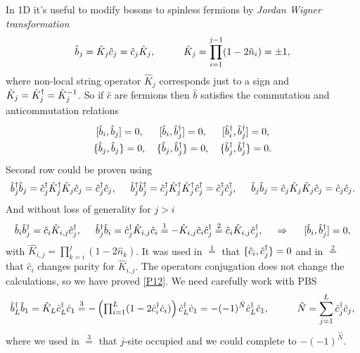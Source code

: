 In 1D it's useful to modify bosons to spinless fermions by \textit{Jordan Wigner transformation}
\begin{equation*}
	\hat{b}_j = \hat{K}_j \hat{c}_j = \hat{c}_j \hat{K}_j,
	\hspace{10 mm} 
	\hat{K}_j = \prod_{i=1}^{j-1} (1-2 \hat{n}_i) = \pm 1, 
\end{equation*}
where non-local string operator $\hat{K}_j$ corresponds just to a sign and $\hat{K}_j = \hat{K}_j^{\dag} = \hat{K}_j^{-1}$. So if $\hat{c}$ are fermions then $\hat{b}$ satisfies the commutation and anticommutation relations 
\begin{equation}
\renewcommand{\arraystretch}{1.4}
	\begin{tabular}{ccc}
	$[\hat{b}_i, \hat{b}_j] = 0,$ & $[\hat{b}_i, \hat{b}_j\D] = 0,$ & $[\hat{b}_i\D, \hat{b}_j\D] = 0,$ \\
	$\{\hat{b}_j, \hat{b}_j\} = 0,$ & $\{\hat{b}_j, \hat{b}_j\D\} = 0,$ & $\{\hat{b}_j\D, \hat{b}_j\D\} = 0.$
	\end{tabular}
	\label{P12}
\end{equation}
Second row could be proven using
\begin{equation*}
	\hat{b}^{\dag}_j \hat{b}_j = \hat{c}_j^{\dag} \hat{K}_j^{\dag} \hat{K}_j \hat{c}_j = \hat{c}_j^{\dag} \hat{c}_j,
	\hspace{5 mm} 
	\hat{b}^{\dag}_j \hat{b}_j^{\dag} = \hat{c}_j^{\dag} \hat{K}_j^{\dag} \hat{K}_j^{\dag} \hat{c}_j^{\dag} = \hat{c}_j^{\dag} \hat{c}_j^{\dag},
	\hspace{5 mm} 
	\hat{b}_j \hat{b}_j = \hat{c}_j \hat{K}_j \hat{K}_j \hat{c}_j = \hat{c}_j \hat{c}_j.
\end{equation*}
And without loss of generality for $j>i$
\begin{equation*}
	\hat{b}_i \hat{b}_j^{\dag} = \hat{c}_i \hat{K}_{i,j} \hat{c}_j^{\dag},
	\hspace{5 mm} 
	\hat{b}_j^{\dag} \hat{b}_i = \hat{c}_j^{\dag} \hat{K}_{i,j} \hat{c}_i \overset{1}{=}  -\hat{K}_{i,j} \hat{c}_i   \hat{c}_j^{\dag} \overset{2}{=} \hat{c}_i \hat{K}_{i,j} \hat{c}_j^{\dag},
	\hspace{0.5cm} \Rightarrow \hspace{0.5cm}
	[\hat{b}_i, \hat{b}_j^{\dag}] = 0,
\end{equation*}
with $\hat{K}_{i,j} = \prod_{k=i}^{j}(1-2\hat{n}_k)$. It was used in $\overset{1}{=}$ that 
$\{\hat{c}_i, \hat{c}_j^{\dag}\}=0$ and in $\overset{2}{=}$ that $\hat{c}_i$ changes parity for $\hat{K}_{i,j}$. The operators conjugation does not change the calculations, so we have proved \eqref{P12}. We need carefully work with PBS
\begin{equation*}
	\hat{b}_L\D \hat{b}_{1} = \hat{K}_L \hat{c}_L\D \hat{c}_1 \overset{3}{=}  -\left( \textstyle \prod_{i=1}^{L} (1-2 \hat{c}_i\D \hat{c}_i)\right) \hat{c}_L\D \hat{c}_1 = - (-1)^{\hat{N}}  \hat{c}_L\D \hat{c}_1,
	\hspace{10 mm} 
	\hat{N} = \sum_{j=1}^{L} \hat{c}_j\D \hat{c}_j,
\end{equation*}
where we used in $\overset{3}{=}$ that $j$-site occupied and we could complete to $- (-1)^{\hat{N}} $.

